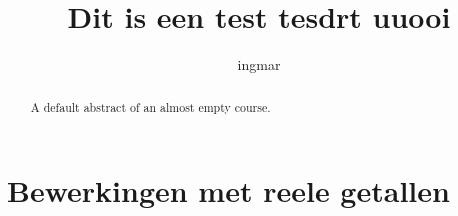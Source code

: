 \documentclass{xourse}
\title{Dit is een test tesdrt uuooi}
\author{ingmar}
\begin{document}
\begin{abstract}
    A default abstract of an almost empty course.
\end{abstract}
\maketitle

\part{Bewerkingen met reele getallen}
\end{document}
